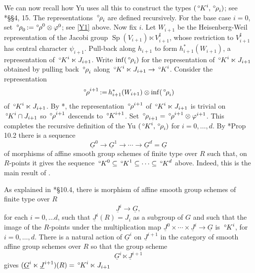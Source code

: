 \documentclass[10pt]{amsart}
\theoremstyle{plain}
\theoremstyle{definition}
\newcommand{\ceq}{{\, :=\, }}
\newcommand{\Sp}{{\operatorname{Sp}}}
\newcommand{\oK}{{\,^\circ \hskip-1pt K}}
\newcommand{\orho}{{\,^\circ \hskip-1pt \rho}}
\begin{document}
We can now recall how Yu uses all this to construct the types $(\oK^i,\orho_i)$; see \cite{yu:01a}*{\S\S 4, 15}.
The representations $\orho_i$ are defined recursively.
For the base case $i=0$, set $\orho_0 \ceq \orho^0\otimes \varphi^0$; see \ref{Y1} above.
Now fix $i$.
Let $W_{i+1}$ be the Heisenberg-Weil representation of the Jacobi group $\Sp(V_{i+1})\ltimes V_{i+1}^\sharp$, whose restriction to $V_{i+1}^\sharp$ has central character $\psi_{i+1}$.
Pull-back along $h_{i+1}$ to form $h_{i+1}^*(W_{i+1})$, a representation of $\oK^i \ltimes J_{i+1}$.
Write $\inf(\orho_i)$ for the representation of $\oK^i \ltimes J_{i+1}$ obtained by pulling back $\orho_i$ along $\oK^i \ltimes J_{i+1} \to \oK^i$. 
Consider the representation
\begin{equation}\label{eq:tensor}
\orho^{i+1} \ceq h_{i+1}^*(W_{i+1}) \otimes \inf(\orho_i)
\end{equation}
of $\oK^i \ltimes J_{i+1}$.
By \cite{yu:01a}*{}, the representation $\orho^{i+1}$ of $\oK^i \ltimes J_{i+1}$ is trivial on $\oK^{i}\cap J_{i+1}$ so $\orho^{i+1}$ descends to $\oK^{i+1}$. 
%
Set $\orho_{i+1} = \orho^{i+1}\otimes \varphi^{i+1}$.
This completes the recursive definition of the Yu $(\oK^i,\orho_i)$ for $i=0, \ldots , d$.
By \cite{Yu:models}*{Prop 10.2} there is a sequence  
\[
\underline{G}^0 \to \underline{G}^1 \to \cdots \to \underline{G}^d = \underline{G}
\]
of morphisms of affine smooth group schemes of finite type over $R$ such that, on $R$-points it gives the sequence $\oK^0 \subseteq \oK^1 \subseteq \cdots \subseteq \oK^d$ above.
Indeed, this is the main result of \cite{Yu:models}.

As explained in \cite{Yu:models}*{\S 10.4}, there is morphism of affine smooth group schemes of finite type over $R$ 
\[
\underline{J}^i \to \underline{G},
\] 
for each $i=0,\ldots d$, such that $\underline{J}^i(R) = J_i$ as a subgroup of $G$ and such that the image of the $R$-points under the multiplication map $\underline{J}^0 \times \cdots \times \underline{J}^i \to \underline{G}$ is $\oK^i$, for $i=0, \ldots , d$.
There is a natural action of $\underline{G}^i$ on $\underline{J}^{i+1}$ in the category of smooth affine group schemes over $R$ so that the group scheme
\[
\underline{G}^i \ltimes \underline{J}^{i+1}
\]
gives $(\underline{G}^i \ltimes \underline{J}^{i+1})(R) = \oK^i \ltimes J_{i+1}$

\newcommand{\reductive}{{\operatorname{red}}}
\end{document}
